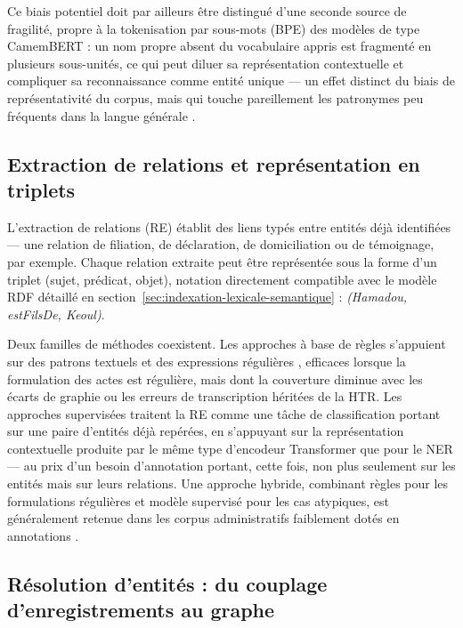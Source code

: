 Ce biais potentiel doit par ailleurs être distingué d'une seconde source de fragilité, propre à la tokenisation par sous-mots (BPE) des modèles de type CamemBERT : un nom propre absent du vocabulaire appris est fragmenté en plusieurs sous-unités, ce qui peut diluer sa représentation contextuelle et compliquer sa reconnaissance comme entité unique \cite{bostrom2020byte} --- un effet distinct du biais de représentativité du corpus, mais qui touche pareillement les patronymes peu fréquents dans la langue générale \cite{ahia2024tokenization}.

\subsection{Extraction de relations et représentation en triplets}
\label{sec:relation-extraction}

L'extraction de relations (RE) établit des liens typés entre entités déjà identifiées --- une relation de filiation, de déclaration, de domiciliation ou de témoignage, par exemple.
Chaque relation extraite peut être représentée sous la forme d'un triplet (sujet, prédicat, objet), notation directement compatible avec le modèle RDF détaillé en section~\ref{sec:indexation-lexicale-semantique} : \textit{(Hamadou, estFilsDe, Keoul)}.

Deux familles de méthodes coexistent. Les approches à base de règles s'appuient sur des patrons textuels et des expressions régulières \cite{hearst1992automatic}, efficaces lorsque la formulation des actes est régulière, mais dont la couverture diminue avec les écarts de graphie ou les erreurs de transcription héritées de la HTR.
Les approches supervisées traitent la RE comme une tâche de classification portant sur une paire d'entités déjà repérées, en s'appuyant sur la représentation contextuelle produite par le même type d'encodeur Transformer que pour le NER \cite{baldini2019matching} --- au prix d'un besoin d'annotation portant, cette fois, non plus seulement sur les entités mais sur leurs relations.
Une approche hybride, combinant règles pour les formulations régulières et modèle supervisé pour les cas atypiques, est généralement retenue dans les corpus administratifs faiblement dotés en annotations \cite{waltl2018rule}.

\subsection{Résolution d'entités : du couplage d'enregistrements au graphe}
\label{sec:resolution-entites}

